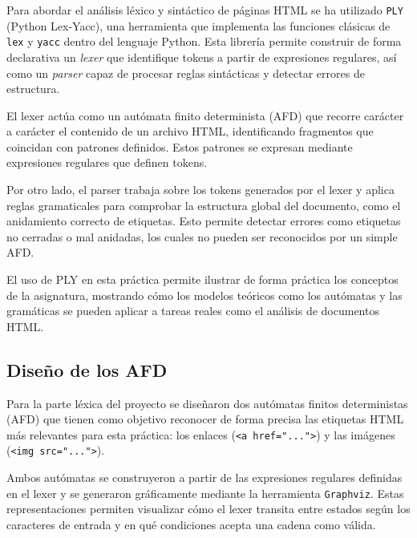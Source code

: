 \documentclass[11pt,a4paper]{article}
\begin{document}
Para abordar el análisis léxico y sintáctico de páginas HTML se ha utilizado \texttt{PLY} (Python Lex-Yacc), una herramienta que implementa las funciones clásicas de \texttt{lex} y \texttt{yacc} dentro del lenguaje Python. Esta librería permite construir de forma declarativa un \textit{lexer} que identifique tokens a partir de expresiones regulares, así como un \textit{parser} capaz de procesar reglas sintácticas y detectar errores de estructura.

\medskip

El lexer actúa como un autómata finito determinista (AFD) que recorre carácter a carácter el contenido de un archivo HTML, identificando fragmentos que coincidan con patrones definidos. Estos patrones se expresan mediante expresiones regulares que definen tokens.

\medskip

Por otro lado, el parser trabaja sobre los tokens generados por el lexer y aplica reglas gramaticales para comprobar la estructura global del documento, como el anidamiento correcto de etiquetas. Esto permite detectar errores como etiquetas no cerradas o mal anidadas, los cuales no pueden ser reconocidos por un simple AFD.

\medskip

El uso de PLY en esta práctica permite ilustrar de forma práctica los conceptos de la asignatura, mostrando cómo los modelos teóricos como los autómatas y las gramáticas se pueden aplicar a tareas reales como el análisis de documentos HTML.

\subsection{Diseño de los AFD}

Para la parte léxica del proyecto se diseñaron dos autómatas finitos deterministas (AFD) que tienen como objetivo reconocer de forma precisa las etiquetas HTML más relevantes para esta práctica: los enlaces (\texttt{<a href="...">}) y las imágenes (\texttt{<img src="...">}).

\medskip

Ambos autómatas se construyeron a partir de las expresiones regulares definidas en el lexer y se generaron gráficamente mediante la herramienta \texttt{Graphviz}. Estas representaciones permiten visualizar cómo el lexer transita entre estados según los caracteres de entrada y en qué condiciones acepta una cadena como válida.

\medskip
\end{document}
